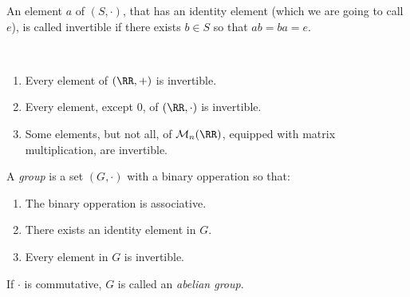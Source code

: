 \begin{defn}
	An element $a$ of  $(S, \cdot)$, that has an identity element (which we are going to call $e$), is called invertible if there exists $b \in S$ so that $ab = ba = e$.
\end{defn}

\begin{exmp}~
	\begin{enumerate}
		\item Every element of $(\RR, +)$ is invertible.
		\item Every element, except $0$, of $(\RR, \cdot)$ is invertible. 
		\item Some elements, but not all, of $\mathcal{M}_n(\RR)$, equipped with matrix multiplication, are invertible.
	\end{enumerate}
\end{exmp}

\begin{defn}
	A \emph{group} is a set $(G, \cdot)$ with a binary opperation so that:
	\begin{enumerate}
		\item The binary opperation is associative.
		\item There exists an identity element in $G$.
		\item Every element in $G$ is invertible.
	\end{enumerate}

	If $\cdot$ is commutative, $G$ is called an \emph{abelian group}.
\end{defn}

